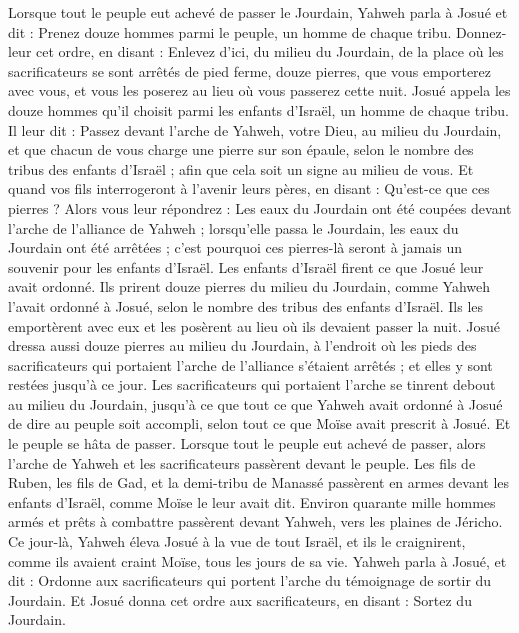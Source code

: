 \begin{multicols}{2}
\VerseOne{}Lorsque tout le peuple eut achevé de passer le Jourdain, Yahweh parla à Josué et dit :
Prenez douze hommes parmi le peuple, un homme de chaque tribu.
Donnez-leur cet ordre, en disant : Enlevez d’ici, du milieu du Jourdain, de la place où les sacrificateurs se sont arrêtés de pied ferme, douze pierres, que vous emporterez avec vous, et vous les poserez au lieu où vous passerez cette nuit.
Josué appela les douze hommes qu’il choisit parmi les enfants d’Israël, un homme de chaque tribu.
Il leur dit : Passez devant l’arche de Yahweh, votre Dieu, au milieu du Jourdain, et que chacun de vous charge une pierre sur son épaule, selon le nombre des tribus des enfants d’Israël ;
afin que cela soit un signe au milieu de vous. Et quand vos fils interrogeront à l’avenir leurs pères, en disant : Qu’est-ce que ces pierres ?
Alors vous leur répondrez : Les eaux du Jourdain ont été coupées devant l’arche de l’alliance de Yahweh ; lorsqu’elle passa le Jourdain, les eaux du Jourdain ont été arrêtées ; c’est pourquoi ces pierres-là seront à jamais un souvenir pour les enfants d’Israël.
Les enfants d’Israël firent ce que Josué leur avait ordonné. Ils prirent douze pierres du milieu du Jourdain, comme Yahweh l’avait ordonné à Josué, selon le nombre des tribus des enfants d’Israël. Ils les emportèrent avec eux et les posèrent au lieu où ils devaient passer la nuit.
Josué dressa aussi douze pierres au milieu du Jourdain, à l’endroit où les pieds des sacrificateurs qui portaient l’arche de l’alliance s’étaient arrêtés ; et elles y sont restées jusqu’à ce jour.
Les sacrificateurs qui portaient l’arche se tinrent debout au milieu du Jourdain, jusqu’à ce que tout ce que Yahweh avait ordonné à Josué de dire au peuple soit accompli, selon tout ce que Moïse avait prescrit à Josué. Et le peuple se hâta de passer.
Lorsque tout le peuple eut achevé de passer, alors l’arche de Yahweh et les sacrificateurs passèrent devant le peuple.
Les fils de Ruben, les fils de Gad, et la demi-tribu de Manassé passèrent en armes devant les enfants d’Israël, comme Moïse le leur avait dit.
Environ quarante mille hommes armés et prêts à combattre passèrent devant Yahweh, vers les plaines de Jéricho.
Ce jour-là, Yahweh éleva Josué à la vue de tout Israël, et ils le craignirent, comme ils avaient craint Moïse, tous les jours de sa vie.
Yahweh parla à Josué, et dit :
Ordonne aux sacrificateurs qui portent l’arche du témoignage de sortir du Jourdain.
Et Josué donna cet ordre aux sacrificateurs, en disant : Sortez du Jourdain.

\end{multicols}
